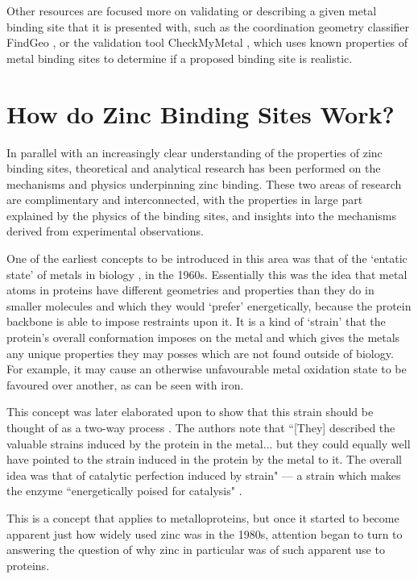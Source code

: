 Other resources are focused more on validating or describing a given metal binding site that it is presented with, such as the coordination geometry classifier FindGeo \cite{andreini2012findgeo}, or the validation tool CheckMyMetal \cite{zheng2017checkmymetal}, which uses known properties of metal binding sites to determine if a proposed binding site is realistic.

\section{How do Zinc Binding Sites Work?}

In parallel with an increasingly clear understanding of the properties of zinc binding sites, theoretical and analytical research has been performed on the mechanisms and physics underpinning zinc binding. These two areas of research are complimentary and interconnected, with the properties in large part explained by the physics of the binding sites, and insights into the mechanisms derived from experimental observations.

One of the earliest concepts to be introduced in this area was that of the `entatic state' of metals in biology \cite{vallee1968metalloenzymes}, in the 1960s. Essentially this was the idea that metal atoms in proteins have different geometries and properties than they do in smaller molecules and which they would `prefer' energetically, because the protein backbone is able to impose restraints upon it. It is a kind of `strain' that the protein's overall conformation imposes on the metal and which gives the metals any unique properties they may posses which are not found outside of biology. For example, it may cause an otherwise unfavourable metal oxidation state to be favoured over another, as can be seen with iron.

This concept was later elaborated upon to show that this strain should be thought of as a two-way process \cite{williams1985symbiosis}. The authors note that ``[They] described the valuable strains induced by the protein in the metal... but they could equally well have pointed to the strain induced in the protein by the metal to it. The overall idea was that of catalytic perfection induced by strain" --- a strain which makes the enzyme ``energetically poised for catalysis" \cite{vallee1984metallobiochemistry}.

This is a concept that applies to metalloproteins, but once it started to become apparent just how widely used zinc was in the 1980s, attention began to turn to answering the question of why zinc in particular was of such apparent use to proteins.

